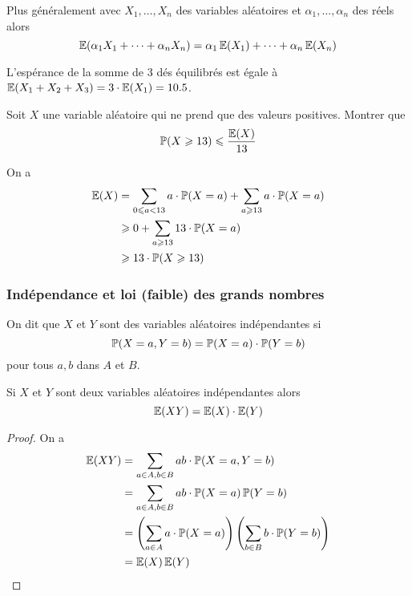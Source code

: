 Plus généralement avec $X_1, \dots, X_n$ des variables aléatoires et $\alpha_1, \dots, \alpha_n$ des réels alors
$$\operatorname{\mathbb E}(\alpha_1X_1 + \dots + \alpha_nX_n) = \alpha_1\operatorname{\mathbb E}(X_1) + \dots + \alpha_n\operatorname{\mathbb E}(X_n)$$


\begin{ex}
L'espérance de la somme de $3$ dés équilibrés est égale à $\operatorname{\mathbb E}(X_1 + X_2 + X_3) = 3 \cdot \operatorname{\mathbb E}(X_1) = 10.5$.
\end{ex}


\begin{exo}
Soit $X$ une variable aléatoire qui ne prend que des valeurs positives. Montrer que
$$\operatorname{\mathbb P}(X\geqslant 13)\leqslant\frac{\operatorname{\mathbb E}(X)}{13}$$
\end{exo}

\begin{sol}
On a
\begin{align*}
\operatorname{\mathbb E}(X)
& = \sum_{0 \leqslant a < 13} a \cdot \operatorname{\mathbb P}(X = a) + \sum_{a\geqslant13}a \cdot \operatorname{\mathbb P}(X = a) \\
& \geqslant 0 + \sum_{a \geqslant 13 }13 \cdot \operatorname{\mathbb P}(X = a) \\
& \geqslant 13 \cdot \operatorname{\mathbb P}(X\geqslant13)
\end{align*}
\end{sol}


\subsubsection{Indépendance et loi (faible) des grands nombres}


\begin{dfn}[Indépendance]
On dit que $X$ et $Y$ sont des variables aléatoires
indépendantes si
$$\operatorname{\mathbb P}(X = a, Y = b) = \operatorname{\mathbb P}(X = a) \cdot \operatorname{\mathbb P}(Y = b)$$
pour tous $a, b$ dans $A$ et $B$.
\end{dfn}


\begin{pro}
Si $X$ et $Y$ sont deux variables aléatoires indépendantes alors
$$\operatorname{\mathbb E}(XY) = \operatorname{\mathbb E}(X) \cdot \operatorname{\mathbb E}(Y)$$
\end{pro}

\begin{proof}
On a
\begin{align*}
\operatorname{\mathbb E}(XY) & = \sum_{a\in A, b\in B}ab \cdot \operatorname{\mathbb P}(X = a, Y = b) \\
& = \sum_{a\in A, b\in B}ab \cdot \operatorname{\mathbb P}(X = a)\operatorname{\mathbb P}(Y = b) \\
& = \left(\sum_{a\in A}a \cdot \operatorname{\mathbb P}(X = a)\right)\left(\sum_{b\in B}b \cdot \operatorname{\mathbb P}(Y = b)\right) \\
& = \operatorname{\mathbb E}(X)\operatorname{\mathbb E}(Y)
\end{align*}
\end{proof}

